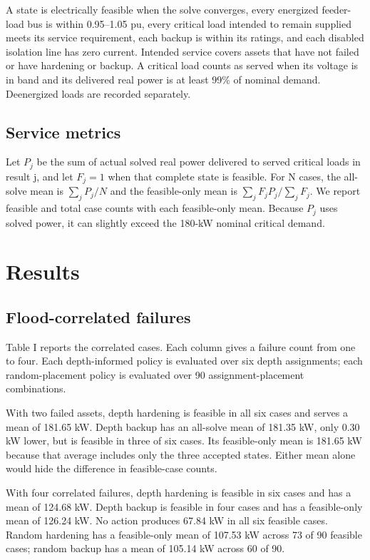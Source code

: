 \documentclass[conference]{IEEEtran}
\begin{document}
A state is electrically feasible when the solve converges, every energized feeder-load bus is within 0.95--1.05 pu, every critical load intended to remain supplied meets its service requirement, each backup is within its ratings, and each disabled isolation line has zero current. Intended service covers assets that have not failed or have hardening or backup. A critical load counts as served when its voltage is in band and its delivered real power is at least 99\% of nominal demand. Deenergized loads are recorded separately.

\subsection{Service metrics}

Let $P_j$ be the sum of actual solved real power delivered to served critical loads in result j, and let $F_j=1$ when that complete state is feasible. For N cases, the all-solve mean is $\sum_j P_j/N$ and the feasible-only mean is $\sum_j F_jP_j/\sum_j F_j$. We report feasible and total case counts with each feasible-only mean. Because $P_j$ uses solved power, it can slightly exceed the 180-kW nominal critical demand.

\section{Results}

\subsection{Flood-correlated failures}

Table I reports the correlated cases. Each column gives a failure count from one to four. Each depth-informed policy is evaluated over six depth assignments; each random-placement policy is evaluated over 90 assignment-placement combinations.

With two failed assets, depth hardening is feasible in all six cases and serves a mean of 181.65 kW. Depth backup has an all-solve mean of 181.35 kW, only 0.30 kW lower, but is feasible in three of six cases. Its feasible-only mean is 181.65 kW because that average includes only the three accepted states. Either mean alone would hide the difference in feasible-case counts.

With four correlated failures, depth hardening is feasible in six cases and has a mean of 124.68 kW. Depth backup is feasible in four cases and has a feasible-only mean of 126.24 kW. No action produces 67.84 kW in all six feasible cases. Random hardening has a feasible-only mean of 107.53 kW across 73 of 90 feasible cases; random backup has a mean of 105.14 kW across 60 of 90.
\end{document}
